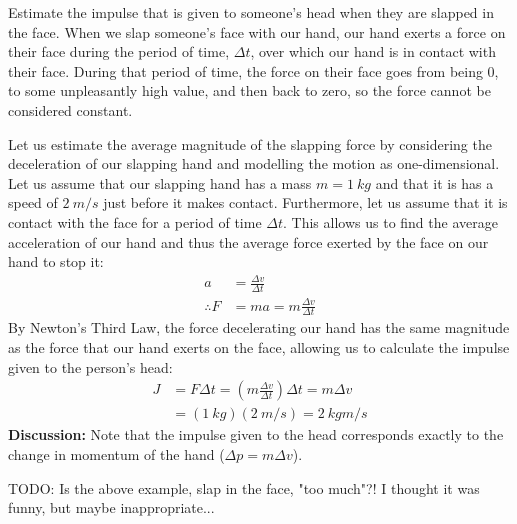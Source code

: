 \begin{example}{Estimate the impulse that is given to someone's head when they are slapped in the face.}
When we slap someone's face with our hand, our hand exerts a force on their face during the period of time, $\Delta t$, over which our hand is in contact with their face. During that period of time, the force on their face goes from being 0, to some unpleasantly high value, and then back to zero, so the force cannot be considered constant. 

Let us estimate the average magnitude of the slapping force by considering the deceleration of our slapping hand and modelling the motion as one-dimensional. Let us assume that our slapping hand has a mass $m=\SI{1}{kg}$ and that it is has a speed of $\SI{2}{m/s}$ just before it makes contact. Furthermore, let us assume that it is contact with the face for a period of time $\Delta t$. This allows us to find the average acceleration of our hand and thus the average force exerted by the face on our hand to stop it:
\begin{align*}
a &= \frac{\Delta v}{\Delta t}\\
\therefore F &= ma = m  \frac{\Delta v}{\Delta t}
\end{align*}
By Newton's Third Law, the force decelerating our hand has the same magnitude as the force that our hand exerts on the face, allowing us to calculate the impulse given to the person's head:
\begin{align*}
J &= F\Delta t =  \left(m  \frac{\Delta v}{\Delta t}\right) \Delta t = m\Delta v\\
&=(\SI{1}{kg})(\SI{2}{m/s})=\SI{2}{kgm/s}
\end{align*}
\textbf{Discussion:} Note that the impulse given to the head corresponds exactly to the change in momentum of the hand ($\Delta p=m\Delta v$).
\end{example}

TODO: Is the above example, slap in the face, "too much"?! I thought it was funny, but maybe inappropriate...

